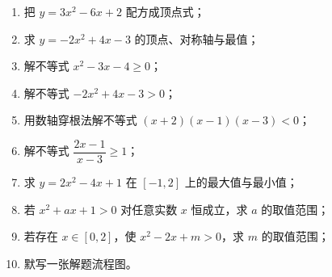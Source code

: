 \begin{homework}
\begin{enumerate}
  \item 把 $y=3x^2-6x+2$ 配方成顶点式；
  \item 求 $y=-2x^2+4x-3$ 的顶点、对称轴与最值；
  \item 解不等式 $x^2-3x-4\geq0$；
  \item 解不等式 $-2x^2+4x-3>0$；
  \item 用数轴穿根法解不等式 $(x+2)(x-1)(x-3)<0$；
  \item 解不等式 $\dfrac{2x-1}{x-3}\geq1$；
  \item 求 $y=2x^2-4x+1$ 在 $[-1,2]$ 上的最大值与最小值；
  \item 若 $x^2+ax+1>0$ 对任意实数 $x$ 恒成立，求 $a$ 的取值范围；
  \item 若存在 $x\in[0,2]$，使 $x^2-2x+m>0$，求 $m$ 的取值范围；
  \item 默写一张解题流程图。
\end{enumerate}
\end{homework}
